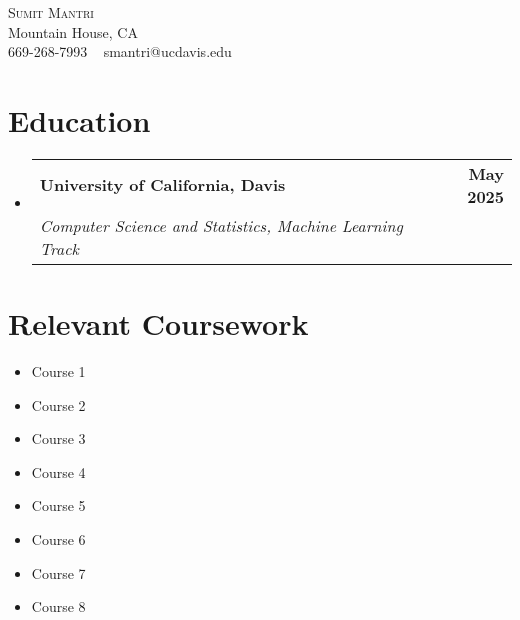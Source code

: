 \documentclass[letterpaper,11pt]{article}
\makeatletter
\newcommand{\resumeSubheading}[4]{
  \vspace{-2pt}\item
  \begin{tabular*}{1.0\textwidth}[t]{l@{\extracolsep{\fill}}r}
    \textbf{#1} & \textbf{\small #2} \\
    \textit{\small#3} & \textit{\small #4} \\
  \end{tabular*}\vspace{-7pt}
}
\newcommand{\resumeSubHeadingListStart}{\begin{itemize}[leftmargin=0.0in, label={}]}
\newcommand{\resumeSubHeadingListEnd}{\end{itemize}}
\makeatother
\begin{document}
\begin{center}
    {\Huge \scshape Sumit Mantri} \\[1pt]
    Mountain House, CA \\[1pt]
    \small 669-268-7993 ~ smantri@ucdavis.edu ~  ~ 
\end{center}

\section{Education}
\resumeSubHeadingListStart
  \resumeSubheading
    {University of California, Davis}{May 2025}
    {Computer Science and Statistics, Machine Learning Track}{}
\resumeSubHeadingListEnd

\section{Relevant Coursework}
\begin{multicols}{4}
    \begin{itemize}[itemsep=-5pt, parsep=3pt]
        \item Course 1
        \item Course 2
        \item Course 3
        \item Course 4
        \item Course 5
        \item Course 6
        \item Course 7
        \item Course 8
    \end{itemize}
\end{multicols}

\end{document}

